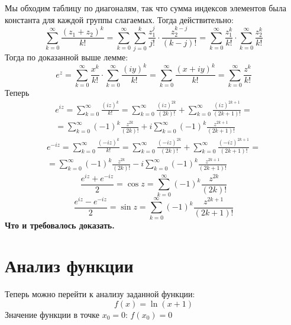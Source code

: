 \documentclass[a4paper,12pt]{article} %
\newcommand{\ryad}{\sum\limits^{\infty}_{k = 0}}
\begin{document}
\begin{table}[h!]
\centering
{}
\end{table}
Мы обходим таблицу по диагоналям, так что сумма индексов элементов была константа для каждой группы слагаемых. Тогда действительно:
$$
\ryad \frac{(z_1 + z_2)^k}{k!} = \ryad  \sum\limits_{j = 0}^k \frac{z_1^j}{j!} \cdot \frac{z_2^{k - j}}{(k - j)!} = \ryad \frac{z_1^k}{k!} \cdot \ryad \frac{z_2^k}{k!}
$$
Тогда по доказанной выше лемме:
$$
e^z = \ryad \frac{x^k}{k!} \cdot \ryad \frac{(iy)^k}{k!} = \ryad \frac{(x + iy)^k}{k!} = \ryad \frac{z^k}{k!}
$$
Теперь 
\begin{multline*}
e^{iz} = \ryad \frac{(iz)^k}{k!} = \ryad \frac{(iz)^{2k}}{(2k)!} + \ryad \frac{(iz)^{2k + 1}}{(2k + 1)!} = \\ = \ryad (-1)^k \frac{z^{2k}}{(2k)!} + i \ryad (-1)^k \frac{z^{2k + 1}}{(2k + 1)!}
\end{multline*}
\begin{multline*}
e^{-iz} = \ryad \frac{(-iz)^k}{k!} = \ryad \frac{(-iz)^{2k}}{(2k)!} + \ryad \frac{(-iz)^{2k + 1}}{(2k + 1)!} = \\ = \ryad (-1)^k \frac{z^{2k}}{(2k)!} - i \ryad (-1)^k \frac{z^{2k + 1}}{(2k + 1)!}
\end{multline*}
$$
\frac{e^{iz} + e^{-iz}}{2} = \cos z = \ryad (-1)^k \frac{z^{2k}}{(2k)!}
$$
$$
\frac{e^{iz} - e^{-iz}}{2} = \sin z = \ryad (-1)^k \frac{z^{2k + 1}}{(2k + 1)!}
$$
\textbf{Что и требовалось доказать.}
\newpage 
 \section{Анализ функции} 
Теперь можно перейти к анализу заданной функции: 
\begin{equation}
 f(x) = \ln {({x} + {{1}})}\end{equation}
Значение функции в точке $x_0 = 0$:  $f(x_0) = 0$ \\ 
\end{document}

